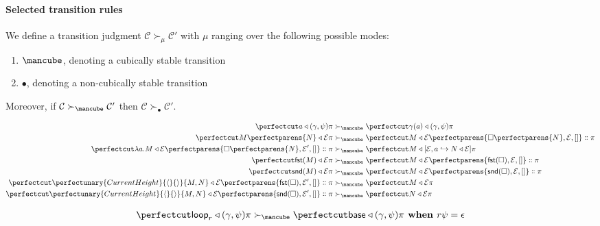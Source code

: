\documentclass{article}
\newcommand\Clo[2]{#1\triangleleft{#2}}
\newcommand\Lam[2]{\lambda{#1}.{#2}}
\newcommand\Fst[1]{\mathsf{fst} (#1)}
\newcommand\Snd[1]{\mathsf{snd} (#1)}
\newcommand\Loop[1]{\mathsf{loop}_{#1}}
\newcommand\Base{\mathsf{base}}
\newcommand\Cons[2]{{#1}\dblcolon{#2}}
\newcommand\Frame[3]{\perfectparens{#1,#2,#3}}
\newcommand\Cfg[3]{\cut{\Clo{#1}{#2}}{#3}}
\newcommand\App[2]{{#1}\perfectparens{#2}}
\newcommand\Pair[2]{\perfectunary{CurrentHeight}{\langle}{\rangle}{#1,#2}}
\newcommand\Stable{\text{\mancube}}
\newcommand\NonStable{\bullet}
\newcommand\Step[3]{{#2}\mathrel{\succ_{#1}}{#3}}
\newcommand\AStep[3]{{#2}&\mathrel{\succ_{#1}}{#3}}
\newcommand\AStepSt[2]{\AStep{\Stable}{#1}{#2}}
\begin{document}
\paragraph{Selected transition rules}

We define a transition judgment
$\Step{\mu}{\mathcal{C}}{\mathcal{C}'}$ with $\mu$ ranging over
the following possible modes:
\begin{enumerate}
\item $\Stable$, denoting a cubically stable transition
\item $\NonStable$, denoting a non-cubically stable transition
\end{enumerate}

Moreover, if $\Step{\Stable}{\mathcal{C}}{\mathcal{C}'}$ then
$\Step{\NonStable}{\mathcal{C}}{\mathcal{C}'}$.


\begin{align}
  \AStepSt{
    \Cfg{a}{(\gamma,\psi)}{\pi}
  }{
    \Cfg{\gamma(a)}{(\gamma,\psi)}{\pi}
  }
  \\
  \AStepSt{
    \Cfg{\App{M}{N}}{\mathcal{E}}{\pi}
  }{
    \Cfg{M}{\mathcal{E}}{\Cons{\Frame{\App{\Box}{N}}{\mathcal{E}}{[]}}{\pi}}
  }
  \\
  \AStepSt{
    \Cfg{\Lam{a}{M}}{\mathcal{E}}{\Cons{\Frame{\App{\Box}{N}}{\mathcal{E}'}{[]}}{\pi}}
  }{
    \Cfg{M}{[\mathcal{E},a\hookrightarrow{\Clo{N}{\mathcal{E}}}]}{\pi}
  }
  \\
  \AStepSt{
    \Cfg{\Fst{M}}{\mathcal{E}}{\pi}
  }{
    \Cfg{M}{\mathcal{E}}{\Cons{\Frame{\Fst{\Box}}{\mathcal{E}}{[]}}{\pi}}
  }
  \\
  \AStepSt{
    \Cfg{\Snd{M}}{\mathcal{E}}{\pi}
  }{
    \Cfg{M}{\mathcal{E}}{\Cons{\Frame{\Snd{\Box}}{\mathcal{E}}{[]}}{\pi}}
  }
  \\
  \AStepSt{
    \Cfg{\Pair{M}{N}}{\mathcal{E}}{\Cons{\Frame{\Fst{\Box}}{\mathcal{E}'}{[]}}{\pi}}
  }{
    \Cfg{M}{\mathcal{E}}{\pi}
  }
  \\
  \AStepSt{
    \Cfg{\Pair{M}{N}}{\mathcal{E}}{\Cons{\Frame{\Snd{\Box}}{\mathcal{E}'}{[]}}{\pi}}
  }{
    \Cfg{N}{\mathcal{E}}{\pi}
  }
\end{align}

\begin{align}
  \AStepSt{
    \Cfg{\Loop{r}}{(\gamma,\psi)}{\pi}
  }{
    \Cfg{\Base}{(\gamma,\psi)}{\pi}
  }
  \textbf{ when } r\psi = \epsilon
  \\
\end{align}
\end{document}
